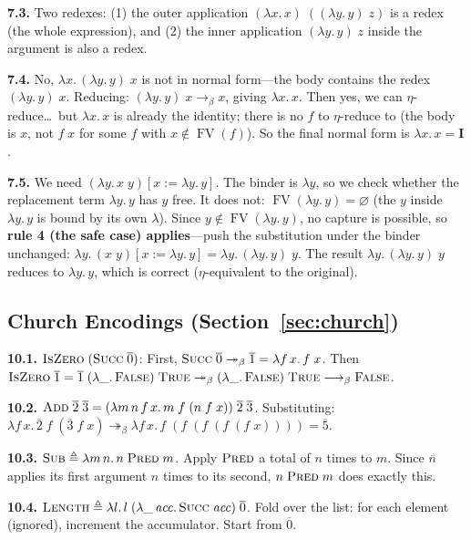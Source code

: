 \documentclass[11pt,a4paper]{article}
\theoremstyle{definition}
\newcommand{\lam}{\lambda}
\newcommand{\reduce}{\longrightarrow_\beta}
\newcommand{\reduces}{\twoheadrightarrow_\beta}
\newcommand{\FV}{\operatorname{FV}}
\newcommand{\church}[1]{\overline{#1}}
\newcommand{\TR}{\textsc{True}}
\newcommand{\FL}{\textsc{False}}
\begin{document}
\medskip
\textbf{7.3.}\; Two redexes: (1) the outer application $(\lam x.\, x)\;((\lam y.\, y)\;z)$ is a redex (the whole expression), and (2) the inner application $(\lam y.\, y)\;z$ inside the argument is also a redex.

\medskip
\textbf{7.4.}\; No, $\lam x.\, (\lam y.\, y)\;x$ is not in normal form---the body contains the redex $(\lam y.\, y)\;x$. Reducing: $(\lam y.\, y)\;x \reduce x$, giving $\lam x.\, x$. Then yes, we can $\eta$-reduce\ldots\ but $\lam x.\, x$ is already the identity; there is no $f$ to $\eta$-reduce to (the body is $x$, not $f\;x$ for some $f$ with $x \notin \FV(f)$). So the final normal form is $\lam x.\, x = \mathbf{I}$.

\medskip
\textbf{7.5.}\; We need $(\lam y.\, x\;y)[x := \lam y.\, y]$. The binder is $\lam y$, so we check whether the replacement term $\lam y.\, y$ has $y$ free. It does not: $\FV(\lam y.\, y) = \varnothing$ (the $y$ inside $\lam y.\, y$ is bound by its own $\lam$). Since $y \notin \FV(\lam y.\, y)$, no capture is possible, so \textbf{rule 4 (the safe case) applies}---push the substitution under the binder unchanged: $\lam y.\, (x\;y)[x := \lam y.\, y] = \lam y.\, (\lam y.\, y)\;y$. The result $\lam y.\, (\lam y.\, y)\;y$ reduces to $\lam y.\, y$, which is correct ($\eta$-equivalent to the original).

\subsection*{Church Encodings (Section~\ref{sec:church})}

\textbf{10.1.}\; $\textsc{IsZero}\;(\textsc{Succ}\;\church{0})$: First, $\textsc{Succ}\;\church{0} \reduces \church{1} = \lam f\,x.\, f\;x$. Then $\textsc{IsZero}\;\church{1} = \church{1}\;(\lam\_.\,\FL)\;\TR \reduces (\lam\_.\,\FL)\;\TR \reduce \FL$.

\medskip
\textbf{10.2.}\; $\textsc{Add}\;\church{2}\;\church{3} = (\lam m\,n\,f\,x.\, m\;f\;(n\;f\;x))\;\church{2}\;\church{3}$. Substituting: $\lam f\,x.\, \church{2}\;f\;(\church{3}\;f\;x) \reduces \lam f\,x.\, f\;(f\;(f\;(f\;(f\;x)))) = \church{5}$.

\medskip
\textbf{10.3.}\; $\textsc{Sub} \triangleq \lam m\, n.\, n\; \textsc{Pred}\; m$. Apply $\textsc{Pred}$ a total of $n$ times to $m$. Since $\church{n}$ applies its first argument $n$ times to its second, $n\;\textsc{Pred}\;m$ does exactly this.

\medskip
\textbf{10.4.}\; $\textsc{Length} \triangleq \lam l.\, l\; (\lam \_\, \mathit{acc}.\, \textsc{Succ}\;\mathit{acc})\; \church{0}$. Fold over the list: for each element (ignored), increment the accumulator. Start from $\church{0}$.
\end{document}
